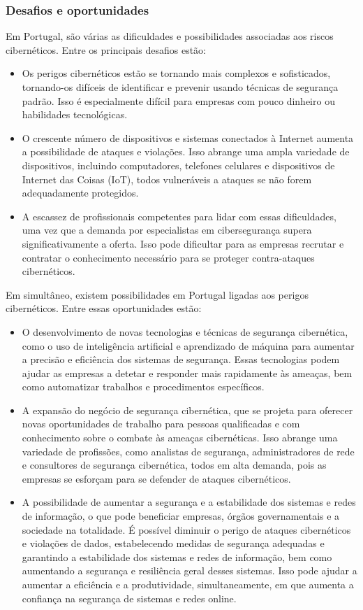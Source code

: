 \subsubsection{Desafios e oportunidades}

Em Portugal, são várias as dificuldades e possibilidades associadas aos riscos cibernéticos. Entre os principais desafios estão:

\begin{itemize}
  \item Os perigos cibernéticos estão se tornando mais complexos e sofisticados, tornando-os difíceis de identificar e prevenir usando técnicas de segurança padrão. Isso é especialmente difícil para empresas com pouco dinheiro ou habilidades tecnológicas.
  \item O crescente número de dispositivos e sistemas conectados à Internet aumenta a possibilidade de ataques e violações. Isso abrange uma ampla variedade de dispositivos, incluindo computadores, telefones celulares e dispositivos de Internet das Coisas (IoT), todos vulneráveis a ataques se não forem adequadamente protegidos.
  \item A escassez de profissionais competentes para lidar com essas dificuldades, uma vez que a demanda por especialistas em cibersegurança supera significativamente a oferta. Isso pode dificultar para as empresas recrutar e contratar o conhecimento necessário para se proteger contra-ataques cibernéticos.
\end{itemize}

Em simultâneo, existem possibilidades em Portugal ligadas aos perigos cibernéticos. Entre essas oportunidades estão:

\begin{itemize}
  \item O desenvolvimento de novas tecnologias e técnicas de segurança cibernética, como o uso de inteligência artificial e aprendizado de máquina para aumentar a precisão e eficiência dos sistemas de segurança. Essas tecnologias podem ajudar as empresas a detetar e responder mais rapidamente às ameaças, bem como automatizar trabalhos e procedimentos específicos.
  \item A expansão do negócio de segurança cibernética, que se projeta para oferecer novas oportunidades de trabalho para pessoas qualificadas e com conhecimento sobre o combate às ameaças cibernéticas. Isso abrange uma variedade de profissões, como analistas de segurança, administradores de rede e consultores de segurança cibernética, todos em alta demanda, pois as empresas se esforçam para se defender de ataques cibernéticos.
  \item A possibilidade de aumentar a segurança e a estabilidade dos sistemas e redes de informação, o que pode beneficiar empresas, órgãos governamentais e a sociedade na totalidade. É possível diminuir o perigo de ataques cibernéticos e violações de dados, estabelecendo medidas de segurança adequadas e garantindo a estabilidade dos sistemas e redes de informação, bem como aumentando a segurança e resiliência geral desses sistemas. Isso pode ajudar a aumentar a eficiência e a produtividade, simultaneamente, em que aumenta a confiança na segurança de sistemas e redes online.
\end{itemize}

